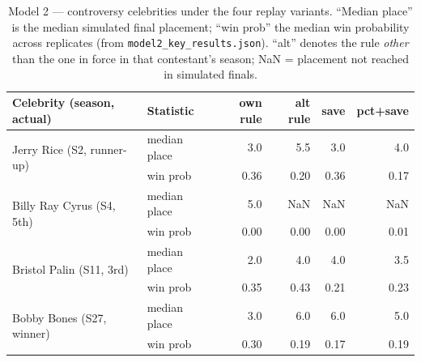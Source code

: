 \documentclass[11pt]{article}
\begin{document}
\begin{table}[H]
\centering
\small
\caption{Model 2 --- controversy celebrities under the four replay variants. ``Median
place'' is the median simulated final placement; ``win prob'' the median win probability
across replicates (from \texttt{model2\_key\_results.json}). ``alt'' denotes the rule
\emph{other} than the one in force in that contestant's season; NaN = placement not
reached in simulated finals.}
\label{tab:controversy}
\begin{tabular}{llrrrr}
\toprule
Celebrity (season, actual) & Statistic & own rule & alt rule & save & pct+save \\
\midrule
\multirow{2}{*}{Jerry Rice (S2, runner-up)} & median place & 3.0 & 5.5 & 3.0 & 4.0 \\
 & win prob & 0.36 & 0.20 & 0.36 & 0.17 \\
\midrule
\multirow{2}{*}{Billy Ray Cyrus (S4, 5th)} & median place & 5.0 & NaN & NaN & NaN \\
 & win prob & 0.00 & 0.00 & 0.00 & 0.01 \\
\midrule
\multirow{2}{*}{Bristol Palin (S11, 3rd)} & median place & 2.0 & 4.0 & 4.0 & 3.5 \\
 & win prob & 0.35 & 0.43 & 0.21 & 0.23 \\
\midrule
\multirow{2}{*}{Bobby Bones (S27, winner)} & median place & 3.0 & 6.0 & 6.0 & 5.0 \\
 & win prob & 0.30 & 0.19 & 0.17 & 0.19 \\
\bottomrule
\end{tabular}
\end{table}
\end{document}
